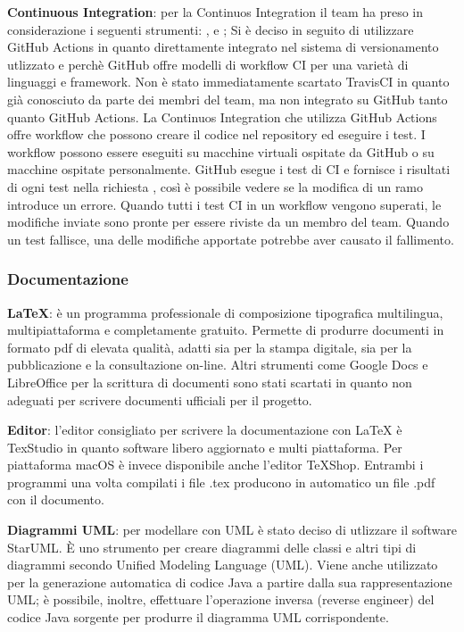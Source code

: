 \begin{description}
\item{\textbf{Continuous Integration}}:  per la Continuos Integration il team ha preso in considerazione i seguenti strumenti: ,  e ;
Si è deciso in seguito di utilizzare GitHub Actions in quanto direttamente integrato nel sistema di versionamento utlizzato e perchè 
GitHub offre modelli di workflow CI per una varietà di linguaggi e framework.
Non è stato immediatamente scartato TravisCI in quanto già conosciuto da parte dei membri del team, ma non integrato su GitHub tanto quanto GitHub Actions.
La Continuos Integration che utilizza GitHub Actions offre workflow che possono creare il codice nel repository ed eseguire i test. 
I workflow possono essere eseguiti su macchine virtuali ospitate da GitHub o su macchine ospitate personalmente.
GitHub esegue i test di CI e fornisce i risultati di ogni test nella richiesta , così è possibile vedere se la modifica di un ramo introduce un errore. 
Quando tutti i test CI in un workflow vengono superati, le modifiche inviate sono pronte per essere riviste da un membro del team. 
Quando un test fallisce, una delle modifiche apportate potrebbe aver causato il fallimento. 

\end{description}

\subsubsection{Documentazione} 
\begin{description}
\item{\textbf{\LaTeX}}: è un programma professionale di composizione tipografica multilingua,
multipiattaforma e completamente gratuito. Permette di produrre documenti in formato pdf di elevata qualità, adatti sia per la stampa digitale, sia
per la pubblicazione e la consultazione on-line. 
Altri strumenti come Google Docs e LibreOffice per la scrittura di documenti sono stati scartati in quanto non adeguati per scrivere documenti ufficiali per il progetto.

\item{\textbf{Editor}}: l’editor  consigliato  per  scrivere  la  documentazione  con  {\LaTeX}  è TexStudio  in  quanto  software  libero  aggiornato  e  multi  piattaforma. Per piattaforma macOS è invece disponibile
anche l'editor TeXShop. Entrambi i programmi una volta compilati i file .tex producono in automatico un file .pdf con il documento.

\item{\textbf{Diagrammi UML}}: per modellare con UML è stato deciso di utlizzare il software StarUML. È uno strumento per creare diagrammi delle classi e altri tipi di diagrammi secondo Unified Modeling Language (UML). 
Viene anche utilizzato per la generazione automatica di codice Java a partire dalla sua rappresentazione UML; è possibile, inoltre, effettuare l’operazione inversa (reverse engineer) del codice Java sorgente per produrre il diagramma UML corrispondente. 
\end{description}

